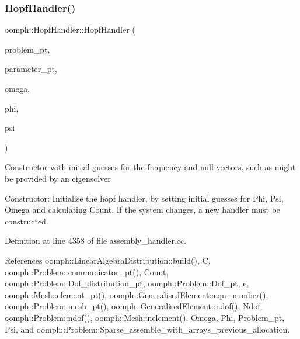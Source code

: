 \mbox{\label{classoomph_1_1HopfHandler_a5799482b1a7d06cbefcbcc862d33b41a}} 
\subsubsection{\texorpdfstring{Hopf\+Handler()}{HopfHandler()}\hspace{0.1cm}{\footnotesize\ttfamily [2/2]}}
{\footnotesize\ttfamily oomph\+::\+Hopf\+Handler\+::\+Hopf\+Handler (\begin{DoxyParamCaption}\item[{\hyperlink{classoomph_1_1Problem}{Problem} $\ast$const \&}]{problem\+\_\+pt,  }\item[{double $\ast$const \&}]{parameter\+\_\+pt,  }\item[{const double \&}]{omega,  }\item[{const \hyperlink{classoomph_1_1DoubleVector}{Double\+Vector} \&}]{phi,  }\item[{const \hyperlink{classoomph_1_1DoubleVector}{Double\+Vector} \&}]{psi }\end{DoxyParamCaption})}

Constructor with initial guesses for the frequency and null vectors, such as might be provided by an eigensolver

Constructor\+: Initialise the hopf handler, by setting initial guesses for Phi, Psi, Omega and calculating Count. If the system changes, a new handler must be constructed. 

Definition at line 4358 of file assembly\+\_\+handler.\+cc.



References oomph\+::\+Linear\+Algebra\+Distribution\+::build(), C, oomph\+::\+Problem\+::communicator\+\_\+pt(), Count, oomph\+::\+Problem\+::\+Dof\+\_\+distribution\+\_\+pt, oomph\+::\+Problem\+::\+Dof\+\_\+pt, e, oomph\+::\+Mesh\+::element\+\_\+pt(), oomph\+::\+Generalised\+Element\+::eqn\+\_\+number(), oomph\+::\+Problem\+::mesh\+\_\+pt(), oomph\+::\+Generalised\+Element\+::ndof(), Ndof, oomph\+::\+Problem\+::ndof(), oomph\+::\+Mesh\+::nelement(), Omega, Phi, Problem\+\_\+pt, Psi, and oomph\+::\+Problem\+::\+Sparse\+\_\+assemble\+\_\+with\+\_\+arrays\+\_\+previous\+\_\+allocation.

\mbox{\label{classoomph_1_1HopfHandler_a2b2822861fc417fea32cbba38f9dd650}} 
